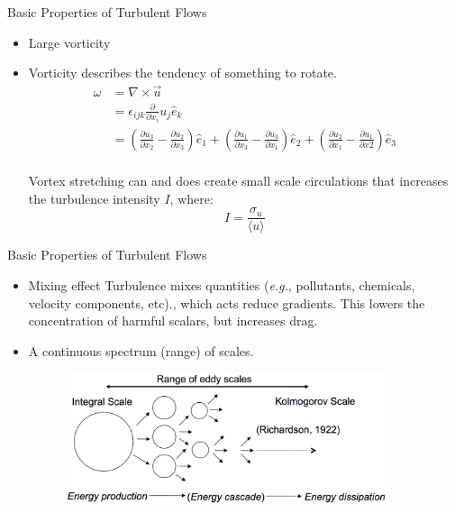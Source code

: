 \begin{frame}{Basic Properties of Turbulent Flows}
\begin{itemize}
\item Large vorticity\newline\newline
\item Vorticity describes the tendency of something to rotate.
\begin{align*}
\omega &= \nabla \times \vec{u}\\
&= \epsilon_{ijk}\frac{\partial}{\partial x_i}u_j \hat{e}_k\\
&= \left(\frac{\partial u_3}{\partial x_2} - \frac{\partial u_2}{\partial x_3}\right)\hat{e}_1 + \left(\frac{\partial u_1}{\partial x_3} - \frac{\partial u_3}{\partial x_1}\right)\hat{e}_2 + \left(\frac{\partial u_2}{\partial x_1} - \frac{\partial u_1}{\partial x2}\right)\hat{e}_3
\end{align*}
~\\
Vortex stretching can and does create small scale circulations that increases the turbulence intensity $I$, where:
$$I = \frac{\sigma_u}{\langle u \rangle}$$
\end{itemize}
\end{frame}


\begin{frame}{Basic Properties of Turbulent Flows}
\begin{itemize}
\item Mixing effect\newline\newline
Turbulence mixes quantities (\textit{e.g.}, pollutants, chemicals, velocity components, etc)., which acts reduce gradients. This lowers the concentration of harmful scalars, but increases drag.
\item A continuous spectrum (range) of scales.
\begin{figure}
\includegraphics[width=0.9\textwidth]{scales}	
\end{figure}
\end{itemize}
\end{frame}

